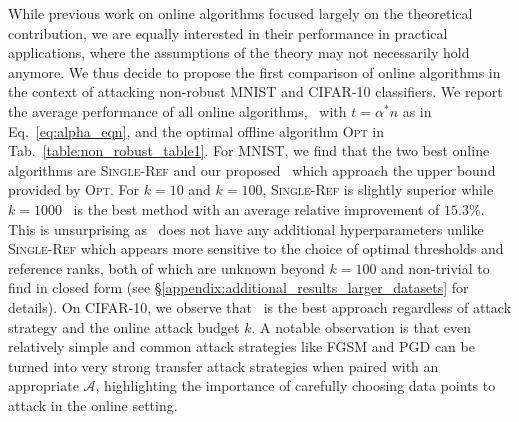 While previous work on online algorithms focused largely on the theoretical contribution, we are equally interested in their performance in practical applications, where the assumptions of the theory may not necessarily hold anymore. We thus decide to propose the first comparison of online algorithms in the context of attacking non-robust MNIST and CIFAR-10 classifiers.  We report the average performance of all online algorithms, \algoname\ with $t=\alpha^* n$ as in Eq.~\ref{eq:alpha_eqn}, and the optimal offline algorithm \textsc{Opt} in Tab.~\ref{table:non_robust_table1}. For MNIST, we find that the two best online algorithms are \textsc{Single-Ref} and our proposed \algoname\ which approach the upper bound provided by \textsc{Opt}. For $k=10$ and $k=100$, \textsc{Single-Ref} is slightly superior while $k=1000$ \algoname\ is the best method with an average relative improvement of $15.3\%$. This is unsurprising as \algoname\ does not have any additional hyperparameters unlike \textsc{Single-Ref} which appears more sensitive to the choice of optimal thresholds and reference ranks, both of which are unknown beyond $k=100$ and non-trivial to find in closed form (see \S\ref{appendix:additional_results_larger_datasets} for details). On CIFAR-10, we observe that \algoname\ is the best approach regardless of attack strategy and the online attack budget $k$. A notable observation is that even relatively simple and common attack strategies like FGSM and PGD can be turned into very strong transfer attack strategies when paired with an appropriate $\mathcal{A}$, highlighting the importance of carefully choosing data points to attack in the online setting. %


